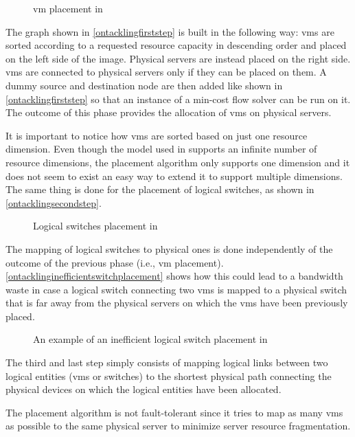 \begin{figure}[!htb]
    \centering
    \usebox{\ontacklingfirststep}
    \caption{\gls{vm} placement in \cite{ontackling}}
    \label{ontacklingfirststep}
\end{figure}

The graph shown in \autoref{ontacklingfirststep} is built in the following way: \glspl{vm} are sorted according to a requested resource capacity in descending order and placed on the left side of the image.
Physical servers are instead placed on the right side.
\glspl{vm} are connected to physical servers only if they can be placed on them.
A dummy source and destination node are then added like shown in \autoref{ontacklingfirststep} so that an instance of a min-cost flow solver can be run on it.
The outcome of this phase provides the allocation of \glspl{vm} on physical servers.

It is important to notice how \glspl{vm} are sorted based on just one resource dimension.
Even though the model used in \cite{ontackling} supports an infinite number of resource dimensions, the placement algorithm only supports one dimension and it does not seem to exist an easy way to extend it to support multiple dimensions.
The same thing is done for the placement of logical switches, as shown in \autoref{ontacklingsecondstep}.

\begin{figure}[!htb]
    \centering
    \usebox{\ontacklingsecondstep}
    \caption{Logical switches placement in \cite{ontackling}}
    \label{ontacklingsecondstep}
\end{figure}

The mapping of logical switches to physical ones is done independently of the outcome of the previous phase (i.e., \gls{vm} placement).
\autoref{ontacklinginefficientswitchplacement} shows how this could lead to a bandwidth waste in case a logical switch connecting two \glspl{vm} is mapped to a physical switch that is far away from the physical servers on which the \glspl{vm} have been previously placed.

\begin{figure}[!htb]
    \centering
    \usebox{\ontacklinginefficientswitchplacement}
    \caption{An example of an inefficient logical switch placement in \cite{ontackling}}
    \label{ontacklinginefficientswitchplacement}
\end{figure}

The third and last step simply consists of mapping logical links between two logical entities (\glspl{vm} or switches) to the shortest physical path connecting the physical devices on which the logical entities have been allocated.

The placement algorithm is not fault-tolerant since it tries to map as many \glspl{vm} as possible to the same physical server to minimize server resource fragmentation.